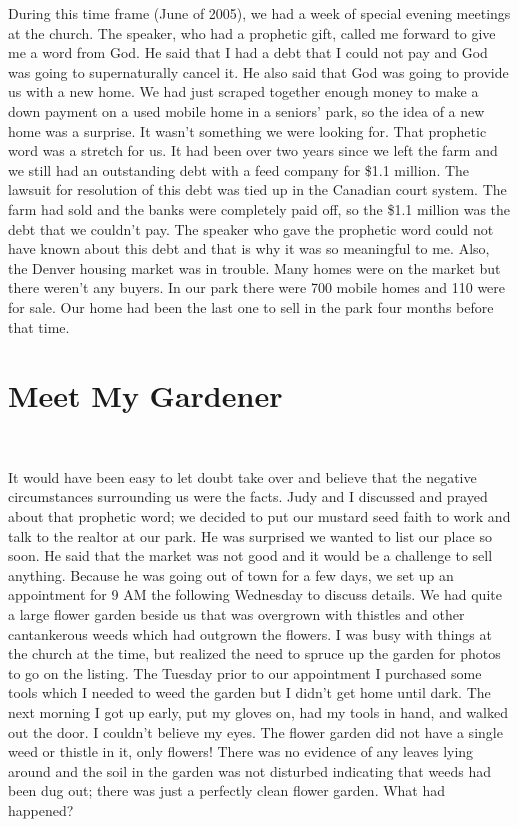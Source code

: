 \documentclass[oneside,12pt]{book}
\begin{document}
During this time frame (June of 2005), we had a week of special evening meetings at the church. The speaker, who had a prophetic gift, called me forward to give me a word from God. He said that I had a debt that I could not pay and God was going to supernaturally cancel it. He also said that God was going to provide us with a new home. We had just scraped together enough money to make a down payment on a used mobile home in a seniors' park, so the idea of a new home was a surprise. It wasn't something we were looking for. That prophetic word was a stretch for us. It had been over two years since we left the farm and we still had an outstanding debt with a feed company for \$1.1 million. The lawsuit for resolution of this debt was tied up in the Canadian court system. The farm had sold and the banks were completely paid off, so the \$1.1 million was the debt that we couldn't pay. The speaker who gave the prophetic word could not have known about this debt and that is why it was so meaningful to me. Also, the Denver housing market was in trouble. Many homes were on the market but there weren't any buyers. In our park there were 700 mobile homes and 110 were for sale. Our home had been the last one to sell in the park four months before that time.


\section{Meet My Gardener}
\

It would have been easy to let doubt take over and believe that the negative circumstances   surrounding us were the facts. Judy and I discussed and prayed about that prophetic word; we decided to put our mustard seed faith to work and talk to the realtor at our park. He was surprised we wanted to list our place so soon. He said that the market was not good and it would be a challenge to sell anything. Because he was going out of town for a few days, we set up an appointment for 9 AM the following Wednesday to discuss details. We had quite a large flower garden beside us that was overgrown with thistles and other cantankerous weeds which had outgrown the flowers. I was busy with things at the church at the time, but realized the need to spruce up the garden for photos to go on the listing. The Tuesday prior to our appointment I purchased some tools which I needed to weed the garden but I didn't get home until dark. The next morning I got up early, put my gloves on, had my tools in hand, and walked out the door. I couldn't believe my eyes. The flower garden did not have a single weed or thistle in it, only flowers! There was no evidence of any leaves lying around and the soil in the garden was not disturbed indicating that weeds had been dug out; there was just a perfectly clean flower garden. What had happened?
\end{document}
